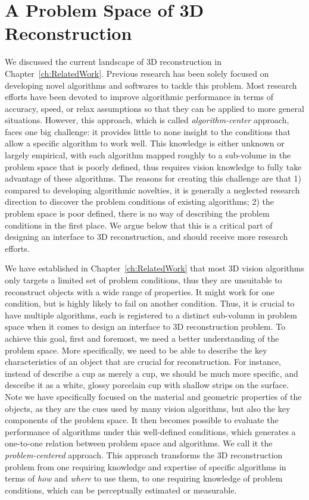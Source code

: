 
\chapter{A Problem Space of 3D Reconstruction}
\label{ch:3DRecon_ProbSpace}
We discussed the current landscape of 3D reconstruction in Chapter~\ref{ch:RelatedWork}. Previous research has been solely focused on developing novel algorithms and softwares to tackle this problem. Most research efforts have been devoted to improve algorithmic performance in terms of accuracy, speed, or relax assumptions so that they can be applied to more general situations. However, this approach, which is called \textit{algorithm-center} approach, faces one big challenge: it provides little to none insight to the conditions that allow a specific algorithm to work well. This knowledge is either unknown or largely empirical, with each algorithm mapped roughly to a sub-volume in the problem space that is poorly defined, thus requires vision knowledge to fully take advantage of these algorithms. The reasons for creating this challenge are that 1) compared to developing algorithmic novelties, it is generally a neglected research direction to discover the problem conditions of existing algorithms; 2) the problem space is poor defined, there is no way of describing the problem conditions in the first place. We argue below that this is a critical part of designing an interface to 3D reconstruction, and should receive more research efforts. 

We have established in Chapter~\ref{ch:RelatedWork} that most 3D vision algorithms only targets a limited set of problem conditions, thus they are unsuitable to reconstruct objects with a wide range of properties. It might work for one condition, but is highly likely to fail on another condition. Thus, it is crucial to have multiple algorithms, each is registered to a distinct sub-volumn in problem space when it comes to design an interface to 3D reconstruction problem. To achieve this goal, first and foremost, we need a better understanding of the problem space. More specifically, we need to be able to describe the key characteristics of an object that are crucial for reconstruction. For instance, instead of describe a cup as merely a cup, we should be much more specific, and desceibe it as a white, glossy porcelain cup with shallow strips on the surface. Note we have specifically focused on the material and geometric properties of the objects, as they are the cues used by many vision algorithms, but also the key components of the problem space. It then becomes possible to evaluate the performance of algorithms under this well-defined conditions, which generates a one-to-one relation between problem space and algorithms. We call it the \textit{problem-centered} approach. This approach transforms the 3D reconstruction problem from one requiring knowledge and expertise of specific algorithms in terms of \textit{how} and \textit{where} to use them, to one requiring knowledge of problem conditions, which can be perceptually estimated or measurable.

